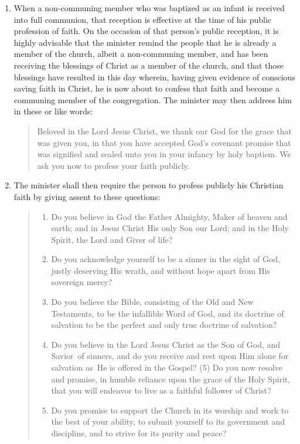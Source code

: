 \documentclass[
]{book}
\providecommand{\tightlist}{%
  \setlength{\itemsep}{0pt}\setlength{\parskip}{0pt}}
\begin{document}
\begin{enumerate}
\def\labelenumi{\arabic{enumi}.}
\item
  \protect\hypertarget{62}{\href{}{}}When a non-communing member who was baptized as an infant is received into full communion, that reception is effective at the time of his public profession of faith. On the occasion of that person's public reception, it is highly advisable that the minister remind the people that he is already a member of the church, albeit a non-communing member, and has been receiving the blessings of Christ as a member of the church, and that those blessings have resulted in this day wherein, having given evidence of conscious saving faith in Christ, he is now about to confess that faith and become a communing member of the congregation. The minister may then address him in these or like words:

  \begin{quote}
  Beloved in the Lord Jesus Christ, we thank our God for the grace that was given you, in that you have accepted God's covenant promise that was signified and sealed unto you in your infancy by holy baptism. We ask you now to profess your faith publicly.
  \end{quote}
\item
  The minister shall then require the person to profess publicly his Christian faith by giving assent to these questions:

  \begin{quote}
  \begin{enumerate}
  \def\labelenumii{(\arabic{enumii})}
  \tightlist
  \item
    Do you believe in God the Father Almighty, Maker of heaven and earth; and in Jesus Christ His only Son our Lord; and in the Holy Spirit, the Lord and Giver of life?
  \item
    Do you acknowledge yourself to be a sinner in the sight of God, justly deserving His wrath, and without hope apart from His sovereign mercy?
  \item
    Do you believe the Bible, consisting of the Old and New Testaments, to be the infallible Word of God, and its doctrine of salvation to be the perfect and only true doctrine of salvation?
  \item
    Do you believe in the Lord Jesus Christ as the Son of God, and Savior~of sinners, and do you receive and rest upon Him alone for salvation as~He is offered in the Gospel?
    (5)\protect\hypertarget{62.2.5}{\href{}{}} Do you now resolve and promise, in humble reliance upon the grace of the Holy Spirit, that you will endeavor to live as a faithful follower of Christ?
  \item
    Do you promise to support the Church in its worship and work to the best of your ability, to submit yourself to its government and discipline, and to strive for its purity and peace?
  \end{enumerate}
  \end{quote}


\end{enumerate}
\end{document}
